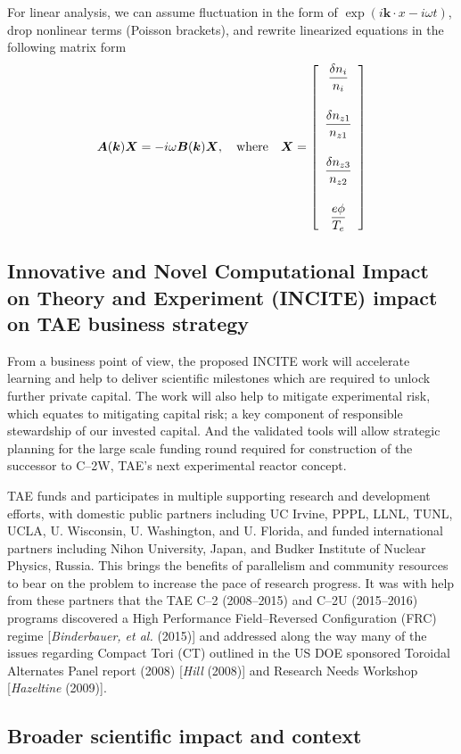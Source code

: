 \documentclass[a4paper,openany,12pt]{book}
\begin{document}
For linear analysis, we can assume fluctuation in the form of 
$\exp(i{\bm k\cdot x}-i\omega t)$, drop nonlinear terms (Poisson brackets), and rewrite linearized equations in the following matrix form
$$\bm{A}(\bm{k})\bm{X}=-i\omega\bm{B}(\bm{k})\bm{X},\quad\mbox{where}\quad\bm{X}=
\left[\begin{array}{c} \displaystyle{\delta n_i\over n_i}\\[20pt]
\displaystyle{\delta n_{z1}\over n_{z1}}\\[20pt]
\displaystyle{\delta n_{z3}\over n_{z2}}\\[20pt]
\displaystyle{e\phi\over T_e}\end{array}\right]$$
%
\subsection{Innovative and Novel Computational Impact on Theory and Experiment (INCITE) impact on TAE business strategy}

From a business point of view, the proposed INCITE work will accelerate learning and help to deliver
scientific milestones which are required to unlock further private capital. The work will also help to
mitigate experimental risk, which equates to mitigating capital risk; a key component of responsible
stewardship of our invested capital. And the validated tools will allow strategic planning for the large
scale funding round required for construction of the successor to C--2W, TAE's next experimental reactor
concept.

TAE funds and participates in multiple supporting research and development efforts, with domestic public partners including UC Irvine, PPPL, LLNL, TUNL, UCLA, U. Wisconsin, U. Washington, and U. Florida, and funded international partners including Nihon University, Japan, and Budker Institute of Nuclear Physics, Russia. This brings the benefits of parallelism and community resources to bear on the problem to increase the pace of research progress. It was with help from these partners that the TAE C--2 (2008--2015) and C--2U (2015--2016) programs discovered a High Performance Field--Reversed Configuration (FRC) regime [\emph{Binderbauer, et al.} (2015)] and addressed along the way many of the issues regarding Compact Tori (CT) outlined in the US DOE sponsored Toroidal Alternates Panel report (2008) [\emph{Hill} (2008)] and Research Needs Workshop [\emph{Hazeltine} (2009)].

\subsection{Broader scientific impact and context}
\end{document}
